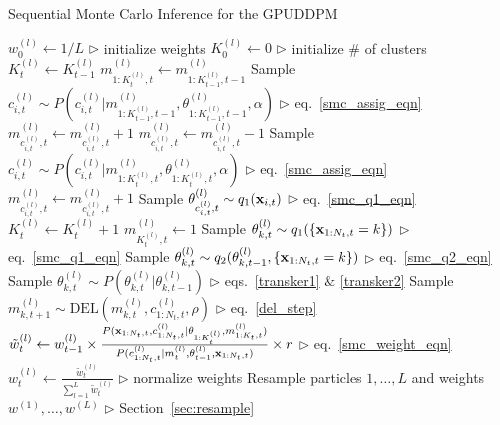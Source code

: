 \documentclass[smallcondensed, final]{svjour3}
\begin{document}
\begin{algorithm}[!]
\caption{Sequential Monte Carlo Inference for the GPUDDPM}
\label{alg:SMC}
\begin{algorithmic}[1]
\STATE $w_{0}^{(l)} \leftarrow 1/L$ \hfill $\triangleright$ initialize weights
\ENDFOR
\STATE $K_{0}^{(l)} \leftarrow 0$ \hfill $\triangleright$ initialize \# of clusters
\STATE $K_{t}^{(l)}  \leftarrow K_{t-1}^{(l)}$
\STATE $m_{1:K_{t}^{(l)}, t}^{(l)} \leftarrow m_{1:K_{t-1}^{(l)}, t-1}^{(l)}$
\STATE Sample $c_{i,t}^{(l)} \sim P \left( c_{i,t}^{(l)} | m_{1:K_{t-1}^{(l)}, t-1}^{(l)}, \theta_{1:K_{t-1}^{(l)}, t-1}^{(l)}, \alpha \right)$  \hfill $\triangleright$ eq.~\eqref{smc_assig_eqn}
\STATE $m_{c_{i,t}^{(l)},t}^{(l)} \leftarrow m_{c_{i,t}^{(l)},t}^{(l)} + 1$
\ELSE
\STATE $m_{c_{i,t}^{(l)},t}^{(l)} \leftarrow m_{c_{i,t}^{(l)},t}^{(l)} - 1$
\STATE Sample $c_{i,t}^{(l)} \sim P \left( c_{i,t}^{(l)} | m_{1:K_{t}^{(l)}, t}^{(l)}, \theta_{1:K_{t}^{(l)}, t}^{(l)}, \alpha \right)$  \hfill $\triangleright$ eq.~\eqref{smc_assig_eqn}
\STATE $m_{c_{i,t}^{(l)},t}^{(l)} \leftarrow m_{c_{i,t}^{(l)},t}^{(l)} + 1$
\ENDIF
{}
\STATE Sample $\theta_{c_{i,t}^{(l)}, t}^{(l)} \sim q_{1}(\bold{x}_{i,t})$ \hfill $\triangleright$ eq.~\eqref{smc_q1_eqn}
\STATE $K_{t}^{(l)} \leftarrow K_{t}^{(l)} + 1$
\STATE $m_{K_{t}^{(l)},t}^{(l)} \leftarrow 1$
\ENDIF
\ENDFOR
{}
\STATE Sample $\theta_{k,t}^{(l)} \sim q_{1}(\{ \bold{x}_{1:N_{t}, t} = k \})$  \hfill $\triangleright$ eq.~\eqref{smc_q1_eqn}
\STATE Sample $\theta_{k,t}^{(l)} \sim q_{2}(\theta_{k,t-1}^{(l)}, \{ \bold{x}_{1:N_{t}, t} = k \})$  \hfill $\triangleright$ eq.~\eqref{smc_q2_eqn}
\STATE Sample $\theta_{k,t}^{(l)} \sim P(\theta_{k,t}^{(l)} | \theta_{k,t-1}^{(l)})$  \hfill $\triangleright$ eqs.~\eqref{transker1} $\&$ \eqref{transker2}
\ENDIF
{}
\STATE Sample $m_{k,t+1}^{(l)} \sim \text{DEL}(m_{k,t}^{(l)}, c_{1:N_{t}, t}^{(l)}, \rho)$  \hfill $\triangleright$ eq.~\eqref{del_step}
\ENDIF
\ENDFOR
\ENDFOR
\STATE $\tilde{w}_{t}^{(l)} \leftarrow w_{t-1}^{(l)} \times \frac{ P(\bold{x}_{1:N_{t},t}, c_{1:N_{t}, t}^{(l)} | \theta_{1:K_{t}^{(l)}}, m_{1:K_{t},t}^{(l)})}	{P(c_{1:N_{t}, t}^{(l)} | m_{t}^{(l)}, \theta_{t-1}^{(l)}, \bold{x}_{1:N_{t},t} ) } \times r $  \hfill $\triangleright$ eq.~\eqref{smc_weight_eqn}
\ENDFOR
{}
\STATE $w_{t}^{(l)} \leftarrow \frac{\tilde{w}_{t}^{(l)}}{\sum_{l=1}^{L} \tilde{w}_{t}^{(l)} }$   \hfill $\triangleright$ normalize weights
\ENDFOR
\STATE Resample particles $1, \ldots, L$ and weights $w^{(1)}, \ldots, w^{(L)}$   \hfill $\triangleright$ Section~\ref{sec:resample}
\ENDFOR
\end{algorithmic}
\end{algorithm}
\end{document}
